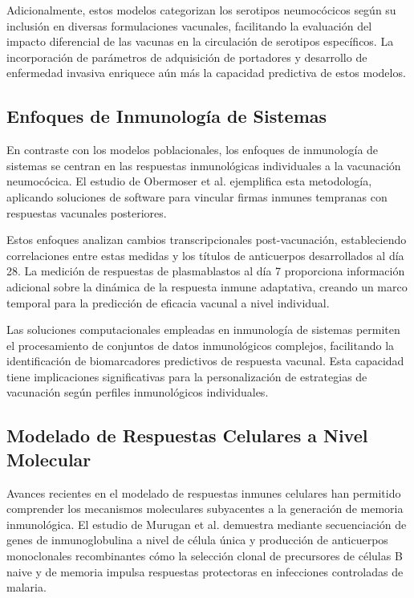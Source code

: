 Adicionalmente, estos modelos categorizan los serotipos neumocócicos según su inclusión en diversas formulaciones vacunales, facilitando la evaluación del impacto diferencial de las vacunas en la circulación de serotipos específicos. La incorporación de parámetros de adquisición de portadores y desarrollo de enfermedad invasiva enriquece aún más la capacidad predictiva de estos modelos.

\subsection{Enfoques de Inmunología de Sistemas}

En contraste con los modelos poblacionales, los enfoques de inmunología de sistemas se centran en las respuestas inmunológicas individuales a la vacunación neumocócica. El estudio de Obermoser et al. \cite{Obermoser2013} ejemplifica esta metodología, aplicando soluciones de software para vincular firmas inmunes tempranas con respuestas vacunales posteriores.

Estos enfoques analizan cambios transcripcionales post-vacunación, estableciendo correlaciones entre estas medidas y los títulos de anticuerpos desarrollados al día 28. La medición de respuestas de plasmablastos al día 7 proporciona información adicional sobre la dinámica de la respuesta inmune adaptativa, creando un marco temporal para la predicción de eficacia vacunal a nivel individual.

Las soluciones computacionales empleadas en inmunología de sistemas permiten el procesamiento de conjuntos de datos inmunológicos complejos, facilitando la identificación de biomarcadores predictivos de respuesta vacunal. Esta capacidad tiene implicaciones significativas para la personalización de estrategias de vacunación según perfiles inmunológicos individuales.

\subsection{Modelado de Respuestas Celulares a Nivel Molecular}

Avances recientes en el modelado de respuestas inmunes celulares han permitido comprender los mecanismos moleculares subyacentes a la generación de memoria inmunológica. El estudio de Murugan et al. \cite{Murugan2018} demuestra mediante secuenciación de genes de inmunoglobulina a nivel de célula única y producción de anticuerpos monoclonales recombinantes cómo la selección clonal de precursores de células B naive y de memoria impulsa respuestas protectoras en infecciones controladas de malaria.


